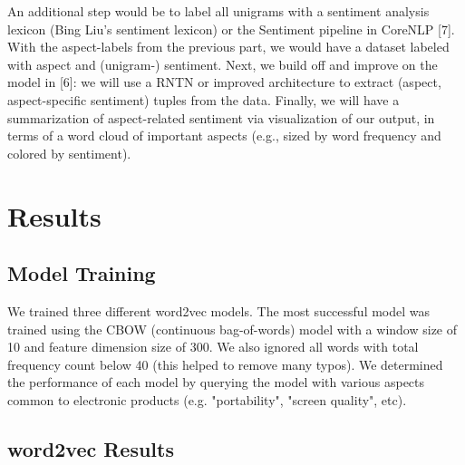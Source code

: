 \documentclass{article} %
\begin{document}
An additional step would be to label all unigrams with a sentiment analysis lexicon (Bing Liu's sentiment lexicon) or the Sentiment pipeline in CoreNLP [7]. With the aspect-labels from the previous part, we would have a dataset labeled with aspect and (unigram-) sentiment. Next, we build off and improve on the model in [6]: we will use a RNTN or improved architecture to extract (aspect, aspect-specific sentiment) tuples from the data. Finally, we will have a summarization of aspect-related sentiment via visualization of our output, in terms of a word cloud of important aspects (e.g., sized by word frequency and colored by sentiment). 






\section{Results}

\subsection{Model Training} We trained three different word2vec models. The most successful model was trained using the CBOW (continuous bag-of-words) model with a window size of 10 and feature dimension size of 300. We also ignored all words with total frequency count below 40 (this helped to remove many typos). We determined the performance of each model by querying the model with various aspects common to electronic products (e.g. "portability", "screen quality", etc).

\subsection{word2vec Results}
\end{document}
